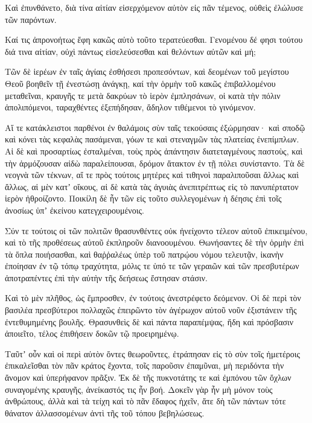 {Καὶ ἐπυνθάνετο, διὰ τίνα αἰτίαν εἰσερχόμενον αὐτὸν εἰς πᾶν τέμενος, οὐθεὶς ἐλώλυσε τῶν παρόντων.
\par }{\PP {}Καί τις ἀπρονοήτως ἔφη κακῶς αὐτὸ τοῦτο τερατεύεσθαι.
Γενομένου δέ φησι τούτου διά τινα αἰτίαν, οὐχὶ πάντως εἰσελεύσεσθαι καὶ θελόντων αὐτῶν καὶ μή;
\par }{\PP {}Τῶν δὲ ἱερέων ἐν ταῖς ἁγίαις ἐσθήσεσι προπεσόντων, καὶ δεομένων τοῦ μεγίστου Θεοῦ βοηθεῖν τῇ ἐνεστώσῃ ἀνάγκῃ, καί τὴν ὁρμὴν τοῦ κακῶς ἐπιβαλλομένου μεταθεῖναι, κραυγῆς τε μετὰ δακρύων τὸ ἱερὸν ἐμπλησάνων,
οἱ κατὰ τὴν πόλιν ἀπολιπόμενοι, ταραχθέντες ἐξεπήδησαν, ἄδηλον τιθέμενοι τὸ γινόμενον.
\par }{\PP {}Αἵ τε κατάκλειστοι παρθένοι ἐν θαλάμοις σὺν ταῖς τεκούσαις ἐξώρμησαν· καὶ σποδῷ καὶ κόνει τὰς κεφαλὰς πασάμεναι, γόων τε καὶ στεναγμῶν τὰς πλατείας ἐνεπίμπλων.
Αἱ δὲ καὶ προσαρτίως ἐσταλμέναι, τοὺς πρὸς ἀπάντησιν διατεταγμένους παστοὺς, καὶ τὴν ἁρμόζουσαν αἰδὼ παραλείπουσαι, δρόμον ἄτακτον ἐν τῇ πόλει συνίσταντο.
Τὰ δὲ νεογνὰ τῶν τέκνων, αἵ τε πρὸς τούτοις μητέρες καὶ τιθηνοὶ παραλιποῦσαι ἄλλως καὶ ἄλλως, αἱ μὲν κατʼ οἴκους, αἱ δὲ κατὰ τὰς ἀγυιὰς ἀνεπιτρέπτως εἰς τὸ πανυπέρτατον ἱερὸν ἠθροίζοντο.
Ποικίλη δὲ ἦν τῶν εἰς τοῦτο συλλεγομένων ἡ δέησις ἐπὶ τοῖς ἀνοσίως ὑπʼ ἐκείνου κατεγχειρουμένοις.
\par }{\PP {}Σύν τε τούτοις οἱ τῶν πολιτῶν θρασυνθέντες οὐκ ἠνείχοντο τέλεον αὐτοῦ ἐπικειμένου, καὶ τὸ τῆς προθέσεως αὐτοῦ ἐκπληροῦν διανοουμένου.
Θωνήσαντες δὲ τὴν ὁρμὴν ἐπὶ τὰ ὅπλα ποιήσασθαι, καὶ θαῤῥαλέως ὑπὲρ τοῦ πατρῴου νόμου τελευτᾷν, ἱκανὴν ἐποίησαν ἐν τῷ τόπῳ τραχύτητα, μόλις τε ὑπό τε τῶν γεραιῶν καὶ τῶν πρεσβυτέρων ἀποτραπέντες ἐπὶ τὴν αὐτὴν τῆς δεήσεως ἔστησαν στάσιν.
\par }{\PP {}Καὶ τὸ μὲν πλῆθος, ὡς ἔμπροσθεν, ἐν τούτοις ἀνεστρέφετο δεόμενον.
Οἱ δὲ περὶ τὸν βασιλέα πρεσβύτεροι πολλαχῶς ἐπειρῶντο τὸν ἀγέρωχον αὐτοῦ νοῦν ἐξιστάνειν τῆς ἐντεθυμημένης βουλῆς.
Θρασυνθεὶς δὲ καὶ πάντα παραπέμψας, ἤδη καὶ πρόσβασιν ἀποιεῖτο, τέλος ἐπιθήσειν δοκῶν τῷ προειρημένῳ.
\par }{\PP {}Ταῦτʼ οὖν καὶ οἱ περὶ αὐτὸν ὄντες θεωροῦντες, ἐτράπησαν εἰς τὸ σὺν τοῖς ἡμετέροις ἐπικαλεῖσθαι τὸν πᾶν κράτος ἔχοντα, τοῖς παροῦσιν ἐπαμῦναι, μὴ περιδόντα τὴν ἄνομον καὶ ὑπερήφανον πρᾶξιν.
Ἐκ δὲ τῆς πυκνοτάτης τε καὶ ἐμπόνου τῶν ὄχλων συναγομένης κραυγῆς, ἀνείκαστός τις ἦν βοή.
Δοκεῖν γὰρ ἦν μὴ μόνον τοὺς ἀνθρώπους, ἀλλὰ καὶ τὰ τείχη καὶ τὸ πᾶν ἔδαφος ἠχεῖν, ἅτε δὴ τῶν πάντων τότε θάνατον ἀλλασσομένων ἀντὶ τῆς τοῦ τόπου βεβηλώσεως.

}
